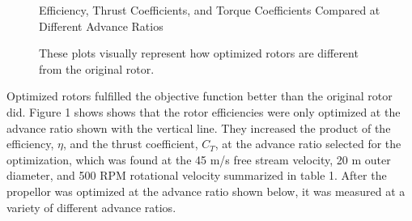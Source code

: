 \documentclass{article}
\begin{document}
\begin{figure}
  \centering

  \hspace{1em}
  \caption{Efficiency, Thrust Coefficients, and Torque Coefficients Compared at Different Advance Ratios}
  \captionsetup{aboveskip=0pt,font=it}
  \caption*{These plots visually represent how optimized rotors are different from the original rotor.}
  \label{fig:1}
\end{figure}

Optimized rotors fulfilled the objective function better than the original rotor did. Figure 1 shows shows that the rotor efficiencies were only optimized at the advance ratio shown with the vertical line. They increased the product of the efficiency, $\eta$, and the thrust coefficient, $C_{T}$, at the advance ratio selected for the optimization, which was found at the 45 m/s free stream velocity, 20 m outer diameter, and 500 RPM rotational velocity summarized in table 1. After the propellor was optimized at the advance ratio shown below, it was measured at a variety of different advance ratios. \newline \break
\end{document}
